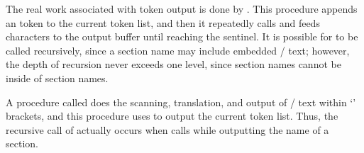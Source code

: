 The real work associated with token output is done by .
This procedure appends an  token to the current token
list,
and then it repeatedly calls  and feeds characters to the
output
buffer until reaching the  sentinel. It is possible
for
 to be called recursively, since a section name may
include
embedded \CEE/ text; however, the depth of recursion never exceeds one
level, since section names cannot be inside of section names.

A procedure called  does the scanning, translation, and
output of \CEE/ text within `\pb' brackets, and this procedure uses
 to output the current token list. Thus, the recursive
call
of  actually occurs when  calls 
while outputting the name of a section.

